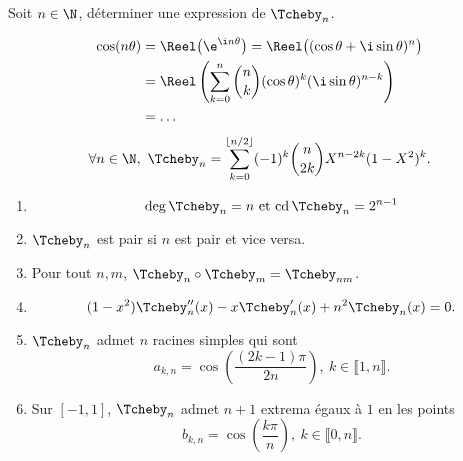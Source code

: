 
\begin{exercice}
    Soit $n \in \N$, déterminer une expression de $\Tcheby_n$.
\end{exercice}  

\begin{solution}
    \begin{align*}
        \cos(n \theta) &= \Reel \big( \e^{\i n \theta} \big) = \Reel \big((\cos \theta + \i \sin \theta)^n \big)\\
        &= \Reel \left( \sum_{k=0}^n \binom{n}{k} (\cos\theta)^k (\i \sin\theta)^{n-k} \right) \\
        &= \ldots
    \end{align*}
    $$\forall n \in \N,\ \Tcheby_n = \sum_{k=0}^{\lfloor n / 2 \rfloor} (-1)^k \binom{n}{2k} X^{n-2k} (1-X^2)^k.$$
\end{solution}

\begin{prop}
    \begin{enumerate}
        \item $$\deg \Tcheby_n = n \text{ et } \mathrm{cd}\, \Tcheby_n = 2^{n-1}$$
        \item $\Tcheby_n$ est pair si $n$ est pair et vice versa. \\
        \item Pour tout $n, m$, $\Tcheby_n \circ \Tcheby_m = \Tcheby_{nm}$. \\
        \item $$(1-x^2) \Tcheby''_n(x) - x \Tcheby'_n(x) + n^2 \Tcheby_n(x) = 0.$$
        \item $\Tcheby_n$ admet $n$ racines simples qui sont
        $$a_{k,n} = \cos \left( \frac{(2k-1) \pi}{2n}\right),\ k \in \llbracket 1, n \rrbracket.$$
        \item Sur $[-1, 1]$, $\Tcheby_n$ admet $n+1$ extrema égaux à $1$ en les points
        $$b_{k,n} = \cos\left( \frac{k \pi}{n} \right),\ k \in \llbracket 0, n \rrbracket.$$
    \end{enumerate}
\end{prop}

\begin{demo}

\end{demo}

